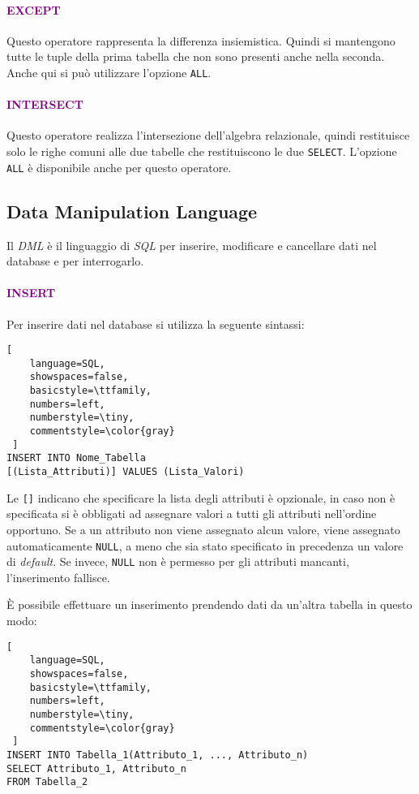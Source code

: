 \paragraph{\textcolor{purple}{EXCEPT}} Questo operatore rappresenta la differenza insiemistica. Quindi si mantengono
tutte le tuple della prima tabella che non sono presenti anche nella seconda. Anche qui si può utilizzare l'opzione \verb|ALL|.

\paragraph{\textcolor{purple}{INTERSECT}} Questo operatore realizza l'intersezione dell'algebra relazionale, quindi restituisce
solo le righe comuni alle due tabelle che restituiscono le due \verb|SELECT|. L'opzione \verb|ALL| è disponibile anche per questo operatore.

\subsection{Data Manipulation Language}

Il \emph{DML} è il linguaggio di \emph{SQL} per inserire, modificare e cancellare dati nel database e per interrogarlo.

\paragraph{\textcolor{purple}{INSERT}} Per inserire dati nel database si utilizza la seguente sintassi:
\begin{lstlisting}[
    language=SQL,
    showspaces=false,
    basicstyle=\ttfamily,
    numbers=left,
    numberstyle=\tiny,
    commentstyle=\color{gray}
 ]
INSERT INTO Nome_Tabella
[(Lista_Attributi)] VALUES (Lista_Valori)
\end{lstlisting}

Le \verb|[]| indicano che specificare la lista degli attributi è opzionale, in caso non è specificata si è obbligati ad assegnare valori a tutti gli attributi
nell'ordine opportuno. Se a un attributo non viene assegnato alcun valore, viene assegnato automaticamente \verb|NULL|, a meno che sia
stato specificato in precedenza un valore di \emph{default}. Se invece, \verb|NULL| non è permesso per gli attributi mancanti, l'inserimento fallisce.

È possibile effettuare un inserimento prendendo dati da un'altra tabella in questo modo:
\begin{lstlisting}[
    language=SQL,
    showspaces=false,
    basicstyle=\ttfamily,
    numbers=left,
    numberstyle=\tiny,
    commentstyle=\color{gray}
 ]
INSERT INTO Tabella_1(Attributo_1, ..., Attributo_n)
SELECT Attributo_1, Attributo_n
FROM Tabella_2
\end{lstlisting}

